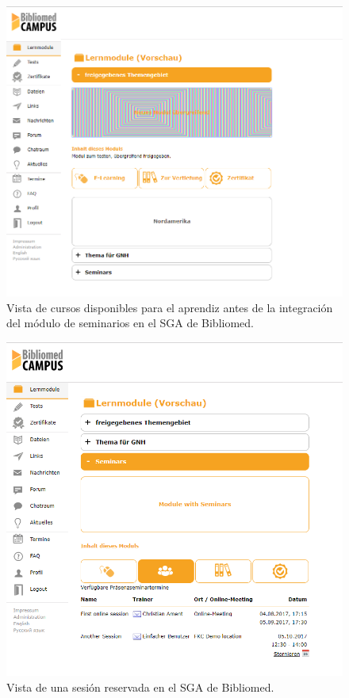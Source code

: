 \begin{figure}[h]
	\begin{center}
		\includegraphics[width=\textwidth]{screenshots/bibliomed_viejo.png}
		\caption{Vista de cursos disponibles para el aprendiz antes de la integración del módulo de seminarios en el SGA de Bibliomed.} \label{fig:bibliomedViejo}
	\end{center}
\end{figure}

\begin{figure}[h]
	\begin{center}
		\includegraphics[width=\textwidth]{screenshots/bibliomed_reservar_sesion.png}
		\caption{Vista de una sesión reservada en el SGA de Bibliomed.} \label{fig:reservarSesionBiliomed}
	\end{center}
\end{figure}













